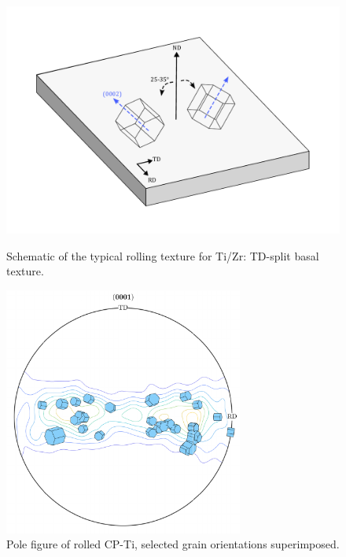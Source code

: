 \begin{figure}[]
\centering
  \includegraphics[width=\textwidth]{Figures/split_basal.pdf}
  \caption{Schematic of the typical rolling texture for Ti/Zr: TD-split basal texture.\label{fig.splitBasal}}
  \vspace{\baselineskip}
  \includegraphics[width=0.7\textwidth]{Figures/pf_unitcells.pdf}
  \caption{Pole figure of rolled CP-Ti, selected grain orientations superimposed. \label{fig.pfunitcells}}
\end{figure}

